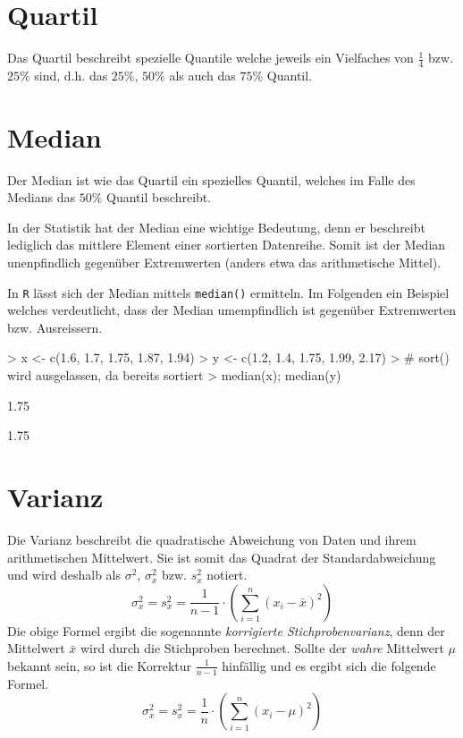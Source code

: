 \section{Quartil}
Das \gls{Quartil} beschreibt spezielle Quantile welche jeweils ein
Vielfaches von $\frac{1}{4}$ bzw. $25\%$ sind, d.h. das
$25\%$, $50\%$ als auch das $75\%$ Quantil.

\section{Median}
Der \gls{Median} ist wie das \gls{Quartil} ein spezielles \gls{Quantil}, 
welches im Falle des Medians das $50\%$ Quantil beschreibt.

In der Statistik hat der Median eine wichtige Bedeutung, denn er 
beschreibt lediglich das mittlere Element einer sortierten Datenreihe.
Somit ist der Median unenpfindlich gegenüber Extremwerten (anders etwa 
das \gls{arithmetische Mittel}).

In \lstinline{R} lässt sich der Median mittels \lstinline{median()}
ermitteln. Im Folgenden ein Beispiel welches verdeutlicht, dass der
Median umempfindlich ist gegenüber Extremwerten bzw. Ausreissern.
\begin{Schunk}
\begin{Sinput}
> x <- c(1.6, 1.7, 1.75, 1.87, 1.94)
> y <- c(1.2, 1.4, 1.75, 1.99, 2.17)
> # sort() wird ausgelassen, da bereits sortiert
> median(x); median(y)
\end{Sinput}
\begin{Soutput}
[1] 1.75
\end{Soutput}
\begin{Soutput}
[1] 1.75
\end{Soutput}
\end{Schunk}

\section{Varianz}\label{sec:varianz}
Die \gls{Varianz} beschreibt die quadratische Abweichung von Daten und
ihrem arithmetischen Mittelwert. Sie ist somit das Quadrat der 
Standardabweichung und wird deshalb als $\sigma^2$, $\sigma_{x}^2$ 
bzw. $s_{x}^2$ notiert.
\[
	\sigma_{x}^2 
	= s_{x}^2 
	= \frac{1}{n-1} \cdot \left(
		\sum_{i=1}^n (x_i-\bar{x})^2 
	\right)
\]
Die obige Formel ergibt die sogenannte 
\emph{korrigierte Stichprobenvarianz}, denn der Mittelwert $\bar{x}$ 
wird durch die Stichproben berechnet. Sollte der \emph{wahre} Mittelwert
$\mu$ bekannt sein, so ist die Korrektur $\frac{1}{n-1}$ hinfällig und
es ergibt sich die folgende Formel.
\[
	\sigma_{x}^2 
	= s_{x}^2 
	= \frac{1}{n} \cdot \left(
		\sum_{i=1}^n (x_i-\mu)^2 
	\right)
\]

